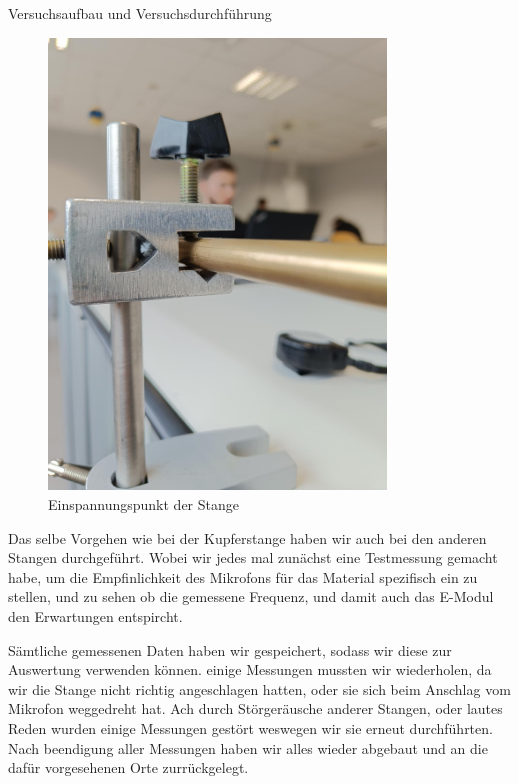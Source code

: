 \documentclass[twoside]{protokoll}
\begin{document}
\begin{aufgabe}{Versuchsaufbau und Versuchsdurchführung}
\begin{figure}[H]
  \centering
  \includegraphics[width=0.8\textwidth]{Bilder/434170_428396_1A3_Einspannung2.pdf}
  \caption{Einspannungspunkt der Stange}
  \centering
\end{figure}

Das selbe Vorgehen wie bei der Kupferstange haben wir auch bei den anderen Stangen durchgeführt. Wobei wir jedes mal zunächst eine Testmessung gemacht habe, um die Empfinlichkeit des Mikrofons für das Material spezifisch ein zu stellen, und zu sehen ob die gemessene Frequenz, und damit auch das E-Modul den Erwartungen entspircht. 

Sämtliche gemessenen Daten haben wir gespeichert, sodass wir diese zur Auswertung verwenden können. einige Messungen mussten wir wiederholen, da wir die Stange nicht richtig angeschlagen hatten, oder sie sich beim Anschlag vom Mikrofon weggedreht hat. Ach durch Störgeräusche anderer Stangen, oder lautes Reden wurden einige Messungen gestört weswegen wir sie erneut durchführten.\\

Nach beendigung aller Messungen haben wir alles wieder abgebaut und an die dafür vorgesehenen Orte zurrückgelegt. 


\end{aufgabe}
\end{document}
